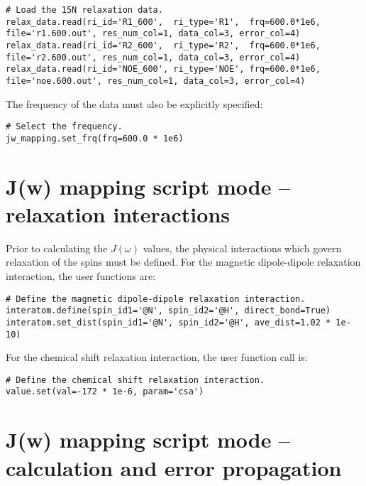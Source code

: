 \begin{lstlisting}[firstnumber=13]
# Load the 15N relaxation data.
relax_data.read(ri_id='R1_600',  ri_type='R1',  frq=600.0*1e6, file='r1.600.out', res_num_col=1, data_col=3, error_col=4)
relax_data.read(ri_id='R2_600',  ri_type='R2',  frq=600.0*1e6, file='r2.600.out', res_num_col=1, data_col=3, error_col=4)
relax_data.read(ri_id='NOE_600', ri_type='NOE', frq=600.0*1e6, file='noe.600.out', res_num_col=1, data_col=3, error_col=4)
\end{lstlisting}

The frequency of the data must also be explicitly specified:

\begin{lstlisting}[firstnumber=28]
# Select the frequency.
jw_mapping.set_frq(frq=600.0 * 1e6)
\end{lstlisting}




\section{J(w) mapping script mode -- relaxation interactions}

Prior to calculating the $J(\omega)$ values, the physical interactions which govern relaxation of the spins must be defined.  For the magnetic dipole-dipole relaxation interaction, the user functions are:

\begin{lstlisting}[firstnumber=21]
# Define the magnetic dipole-dipole relaxation interaction.
interatom.define(spin_id1='@N', spin_id2='@H', direct_bond=True)
interatom.set_dist(spin_id1='@N', spin_id2='@H', ave_dist=1.02 * 1e-10)
\end{lstlisting}

For the chemical shift relaxation interaction, the user function call is:

\begin{lstlisting}[firstnumber=25]
# Define the chemical shift relaxation interaction.
value.set(val=-172 * 1e-6, param='csa')
\end{lstlisting}




\section{J(w) mapping script mode -- calculation and error propagation}

